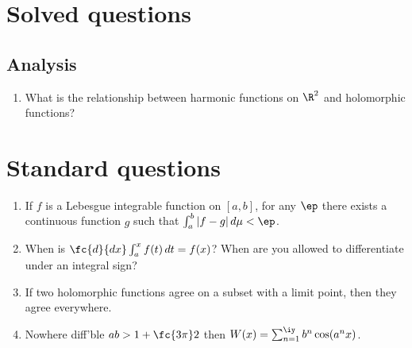\def\filepath{H:/transfer/Math/templates}







\def\name{Questions}



\pagestyle{fancy}
\chead{} 
\rhead{}%
\lfoot{} 
\cfoot{\thepage} 
\rfoot{} %
\renewcommand{\headrulewidth}{.3pt} 
\setlength\voffset{0in}
\setlength\textheight{648pt}


\maketitle

\chapter{Solved questions}
\section{Analysis}
\begin{enumerate}
\item
What is the relationship between harmonic functions on $\R^2$ and holomorphic functions?
\end{enumerate}

\chapter{Standard questions}
\begin{enumerate}
\item
If $f$ is a Lebesgue integrable function on $[a,b]$, for any $\ep$ there exists a continuous function $g$ such that $\int_a^b |f-g|\,d\mu<\ep$.
\item When is $\fc{d}{dx}\int_a^xf(t)\,dt=f(x)$? When are you allowed to differentiate under an integral sign?
\item If two holomorphic functions agree on a subset with a limit point, then they agree everywhere.
\item Nowhere diff'ble $ab>1+\fc{3\pi}2$ then $W(x)=\sum_{n=1}^{\iy} b^n \cos(a^n x)$.
\end{enumerate}

